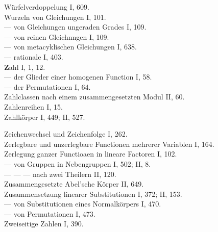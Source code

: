 \begin{flushleft}
W\"urfelverdoppelung I, 609. \\
Wurzeln von Gleichungen I, 101. \\
— von Gleichungen ungeraden Grades I, 109. \\
— von reinen Gleichnngen I, 109. %
\\
— von metacyklischen Gleichungen I, 638. \\
— rationale I, 403. \\[6pt]
\textbf{Z}ahl I, 1, 12. \\
— der Glieder einer homogenen Function I, 58. \\
— der Permutationen I, 64. \\
Zahlclassen nach einem zusammengesetzten Modul II, 60.
\\
Zahlenreihen I, 15. \\
Zahlk\"orper I, 449; II, 527.
\end{flushleft}

\begin{flushleft}
Zeichenwechsel und Zeichenfolge I, 262. \\
Zerlegbare und unzerlegbare Functionen mehrerer Variablen I, 164. \\
Zerlegung ganzer Functioaen in lineare Factoren I, 102. %
\\
— von Gruppen in Nebengruppen I, 502; II, 8. \\
— — — nach zwei Theilern II, 120. \\
Zusammengesetzte Abel'sche K\"orper II, 649. \\
Zusammensetzung linearer Substitutionen I, 372; II, 153. \\
— von Substitutionen eines Normalk\"orpers I, 470. \\
— von Permutationen I, 473. \\
Zweiseitige Zahlen I, 390.
\end{flushleft}
